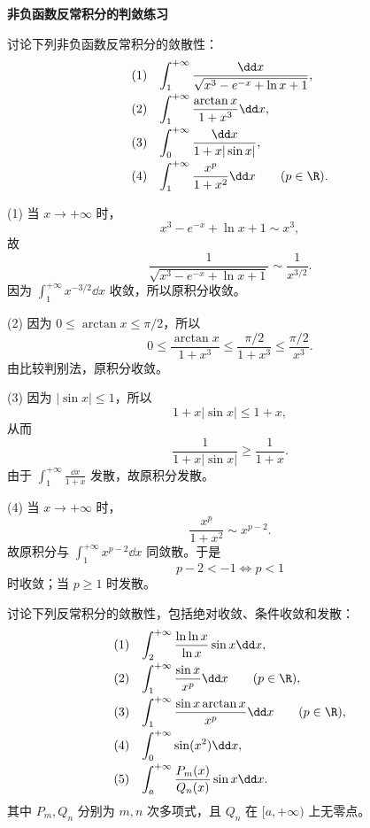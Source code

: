 \textbf{非负函数反常积分的判敛练习}

\begin{problem}
	讨论下列非负函数反常积分的敛散性：
	\[
	\begin{array}{ll}
		(1)&\displaystyle \int_1^{+\infty}\frac{\dd x}{\sqrt{x^3-e^{-x}+\ln x+1}},\\[8pt]
		(2)&\displaystyle \int_1^{+\infty}\frac{\arctan x}{1+x^3}\dd x,\\[8pt]
		(3)&\displaystyle \int_0^{+\infty}\frac{\dd x}{1+x|\sin x|},\\[8pt]
		(4)&\displaystyle \int_1^{+\infty}\frac{x^p}{1+x^2}\dd x\qquad (p\in\R).
	\end{array}
	\]
\end{problem}

\begin{solution}
	(1) 当 $x\to+\infty$ 时，
	\[
	x^3-e^{-x}+\ln x+1\sim x^3,
	\]
	故
	\[
	\frac1{\sqrt{x^3-e^{-x}+\ln x+1}}\sim \frac1{x^{3/2}}.
	\]
	因为 $\displaystyle\int_1^{+\infty}x^{-3/2}\dd x$ 收敛，所以原积分收敛。
	
	(2) 因为 $0\leq\arctan x\leq \pi/2$，所以
	\[
	0\leq \frac{\arctan x}{1+x^3}\leq \frac{\pi/2}{1+x^3}\leq \frac{\pi/2}{x^3}.
	\]
	由比较判别法，原积分收敛。
	
	(3) 因为 $|\sin x|\leq1$，所以
	\[
	1+x|\sin x|\leq 1+x,
	\]
	从而
	\[
	\frac1{1+x|\sin x|}\geq \frac1{1+x}.
	\]
	由于 $\displaystyle\int_1^{+\infty}\frac{\dd x}{1+x}$ 发散，故原积分发散。
	
	(4) 当 $x\to+\infty$ 时，
	\[
	\frac{x^p}{1+x^2}\sim x^{p-2}.
	\]
	故原积分与 $\displaystyle\int_1^{+\infty}x^{p-2}\dd x$ 同敛散。于是
	\[
	p-2<-1\iff p<1
	\]
	时收敛；当 $p\geq1$ 时发散。
\end{solution}



\begin{problem}
	讨论下列反常积分的敛散性，包括绝对收敛、条件收敛和发散：
	\[
	\begin{array}{ll}
		(1)&\displaystyle \int_2^{+\infty}\frac{\ln\ln x}{\ln x}\sin x\dd x,\\[8pt]
		(2)&\displaystyle \int_1^{+\infty}\frac{\sin x}{x^p}\dd x\qquad(p\in\R),\\[8pt]
		(3)&\displaystyle \int_1^{+\infty}\frac{\sin x\arctan x}{x^p}\dd x\qquad(p\in\R),\\[8pt]
		(4)&\displaystyle \int_0^{+\infty}\sin(x^2)\dd x,\\[8pt]
		(5)&\displaystyle \int_a^{+\infty}\frac{P_m(x)}{Q_n(x)}\sin x\dd x.
	\end{array}
	\]
	其中 $P_m,Q_n$ 分别为 $m,n$ 次多项式，且 $Q_n$ 在 $[a,+\infty)$ 上无零点。
\end{problem}

